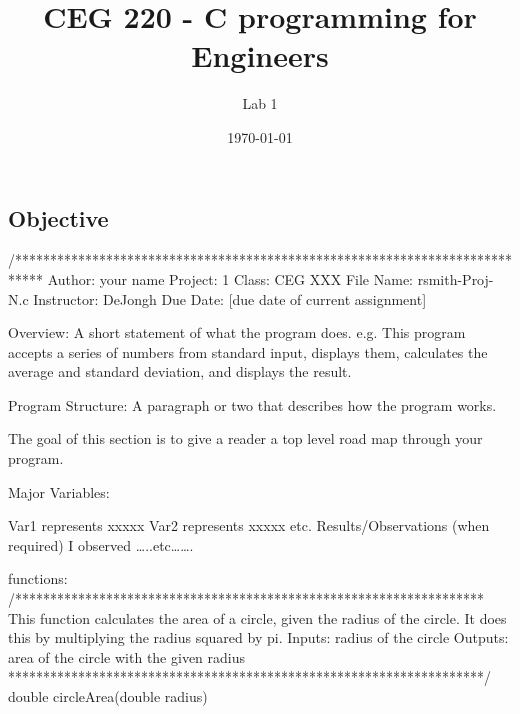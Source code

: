 \documentclass{beamer}
\begin{document}
\title[]{\Huge{CEG 220 - C programming for Engineers}}
\subtitle{\scriptsize{Lab 1}}
\author[]{\selectfont{Shumin Guo}\normalfont}
\date[\today]{\today}

\frame[plain]{\titlepage}


\begin{frame}
\section{Objective} 

\end{frame}

/****************************************************************************
Author: your name         
Project: 1         
Class: CEG XXX
      File Name: rsmith-Proj-N.c        
Instructor: DeJongh                     
Due Date: [due date of current assignment]         
         
Overview:  A short statement of what the program does.  e.g.  This program accepts a series 
of numbers from standard input, displays them, calculates the average and standard deviation, 
and displays the result.


Program Structure:  A paragraph or two that describes how the program
works. 

The goal of this section is to give a reader a top level road map through your program.        
         
Major Variables:
        
Var1 represents xxxxx         
       Var2 represents xxxxx
etc.
Results/Observations (when required)
I observed …..etc…….

functions:
 /*******************************************************************
This function calculates the area of a circle, given the radius of the circle.
          It does this by multiplying the radius squared by pi.
Inputs:       radius of the circle
Outputs:    area of the circle with the given radius
      ********************************************************************/
double circleArea(double radius)
\end{document}
